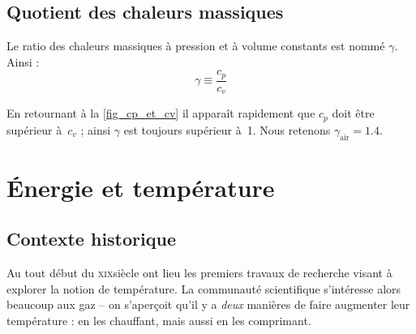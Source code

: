 	\subsection{Quotient des chaleurs massiques}
	
		Le ratio des chaleurs massiques à pression et à volume constants est nommé $\gamma $. Ainsi :
		\begin{equation}
			\gamma \equiv \frac{c_p}{c_v}
			\label{def_gamma}
		\end{equation}

		En retournant à la \cref{fig_cp_et_cv} il apparaît rapidement que $c_p$ doit être supérieur à~$c_v$ ; ainsi $\gamma$ est toujours supérieur à~\num{1}. Nous retenons $\gamma_\text{air} = \num{1,4}$.
		
		
\onlyframabook{\clearpage}%
\section{Énergie et température}

	\subsection{Contexte historique}
	
	
		Au tout début du \textsc{xix}\ieme siècle ont lieu les premiers travaux de recherche visant à explorer la notion de température. La communauté scientifique s’intéresse alors beaucoup aux gaz -- on s’aperçoit qu’il y a \emph{deux} manières de faire augmenter leur température : en les chauffant, mais aussi en les comprimant.
		
